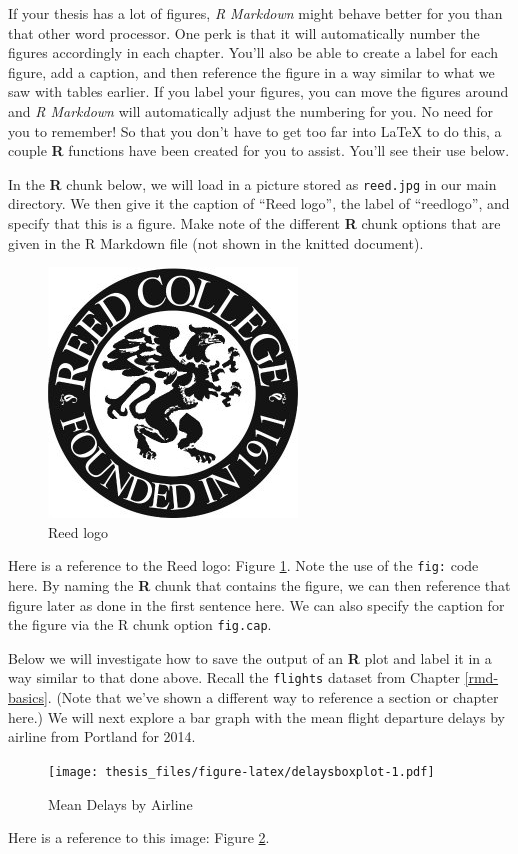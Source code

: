 \documentclass[12pt,twoside]{reedthesis}
\begin{document}
If your thesis has a lot of figures, \emph{R Markdown} might behave better for you than that other word processor. One perk is that it will automatically number the figures accordingly in each chapter. You'll also be able to create a label for each figure, add a caption, and then reference the figure in a way similar to what we saw with tables earlier. If you label your figures, you can move the figures around and \emph{R Markdown} will automatically adjust the numbering for you. No need for you to remember! So that you don't have to get too far into LaTeX to do this, a couple \textbf{R} functions have been created for you to assist. You'll see their use below.

In the \textbf{R} chunk below, we will load in a picture stored as \texttt{reed.jpg} in our main directory. We then give it the caption of ``Reed logo'', the label of ``reedlogo'', and specify that this is a figure. Make note of the different \textbf{R} chunk options that are given in the R Markdown file (not shown in the knitted document).
\begin{figure}

{\centering \includegraphics[width=0.2\linewidth]{figure/reed} 

}

\caption{Reed logo}\label{fig:reedlogo}
\end{figure}
Here is a reference to the Reed logo: Figure \ref{fig:reedlogo}. Note the use of the \texttt{fig:} code here. By naming the \textbf{R} chunk that contains the figure, we can then reference that figure later as done in the first sentence here. We can also specify the caption for the figure via the R chunk option \texttt{fig.cap}.

\clearpage

Below we will investigate how to save the output of an \textbf{R} plot and label it in a way similar to that done above. Recall the \texttt{flights} dataset from Chapter \ref{rmd-basics}. (Note that we've shown a different way to reference a section or chapter here.) We will next explore a bar graph with the mean flight departure delays by airline from Portland for 2014.
\begin{figure}
\centering
\texttt{[image: thesis\_files/figure-latex/delaysboxplot-1.pdf]}
\caption{\label{fig:delaysboxplot}Mean Delays by Airline}
\end{figure}
Here is a reference to this image: Figure \ref{fig:delaysboxplot}.
\end{document}
